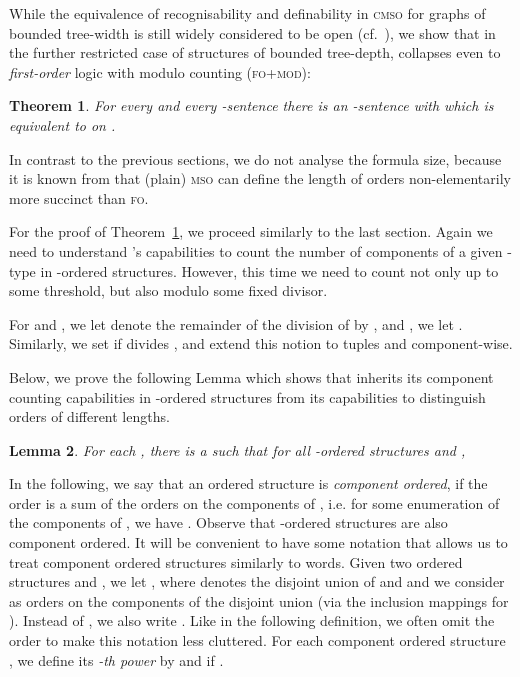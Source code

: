 \documentclass[11pt]{article}
\newtheorem{theorem}{Theorem}
\newtheorem{lemma}[theorem]{Lemma}
\newcommand{\logic}[1]{\textsc{#1}}
\newcommand{\FO}{\logic{fo}}
\newcommand{\FOmod}{\logic{fo+mod}}
\newcommand{\MSO}{\logic{mso}}
\newcommand{\CMSO}{\logic{cmso}}
\begin{document}
While the equivalence of recognisability and definability in \CMSO{} for graphs
of bounded tree-width is still widely considered to be open
(cf.~\cite[p.~574]{CourcelleE2012}), we show that in the further restricted case
of structures of bounded tree-depth,  collapses even to
\emph{first-order} logic with modulo counting (\FOmod{}):

\begin{theorem}
  \label{thm:oimso-eq-fomod}
  For every  and every -sentence  there is an
  -sentence  with 
  which is equivalent to  on .
\end{theorem}

In contrast to the previous sections, we do not analyse the formula size,
because it is known from \cite{GroheSchweikardt05} that (plain) \MSO{} can
define the length of orders non-elementarily more succinct than \FO{}.

For the proof of Theorem~\ref{thm:oimso-eq-fomod}, we proceed similarly to the
last section. Again we need to understand 's capabilities to count the
number of components of a given -type in -ordered structures. However,
this time we need to count not only up to some threshold, but also modulo some
fixed divisor.

For  and , we let  denote the remainder of
the division of  by , and , we
let .
Similarly, we set  if  divides , and extend this notion
to tuples  and  component-wise.

Below, we prove the following Lemma which shows that  inherits its
component counting capabilities in -ordered structures from its
capabilities to distinguish orders of different lengths.

\begin{lemma}
  \label{lem:oimso-cut}
  For each , there is a  such that for all
  -ordered structures  and ,
  
\end{lemma}

In the following, we say that an ordered structure  is
\emph{component ordered}, if the order  is a sum of the
orders on the components of , i.e.  for some enumeration
 of the components of , we have
.  Observe that -ordered structures are
also component ordered.  It will be convenient to have some notation
that allows us to treat component ordered structures similarly to
words. Given two ordered structures  and
, we let ,
where  denotes the disjoint union of  and
 and we consider  as orders on the
components of the disjoint union (via the inclusion mappings for ).  Instead of , we
also write .  Like in the
following definition, we often omit the order to make this notation
less cluttered. For each component ordered structure , we define
its \emph{-th power}  by  and
 if .
\end{document}
